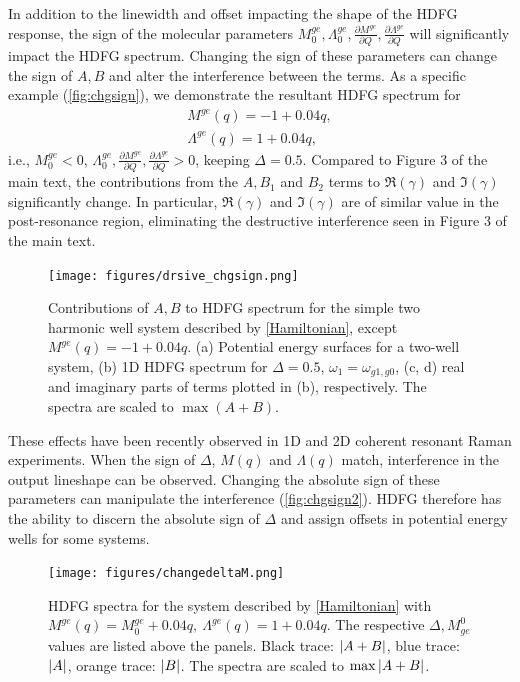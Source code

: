\documentclass[aip, jcp, reprint, onecolumn, nofootinbib]{revtex4-2}
\begin{document}
In addition to the linewidth and offset impacting the shape of the HDFG response, the sign of the molecular parameters $M^{ge}_0, \Lambda^{ge}_0, \frac{\partial M^{ge}}{\partial Q} , \frac{\partial \Lambda^{ge}}{\partial Q}$ will significantly impact the HDFG spectrum.
Changing the sign of these parameters can change the sign of $A, B$ and alter the interference between the terms.  
As a specific example (\autoref{fig:chgsign}), we demonstrate the resultant HDFG spectrum for \begin{eqnarray}
	M^{ge}(q) = -1 + 0.04 q,  \\
	\Lambda^{ge}(q) = 1 + 0.04 q,
\end{eqnarray}
i.e., $M^{ge}_0 < 0$, $\Lambda^{ge}_0, \frac{\partial M^{ge}}{\partial Q} , \frac{\partial \Lambda^{ge}}{\partial Q} > 0$, keeping $\Delta = 0.5$.
Compared to Figure 3 of the main text, the contributions from the $A, B_1$ and $B_2$ terms to $\Re(\gamma)$ and $\Im(\gamma)$ significantly change.
In particular, $\Re(\gamma)$ and $\Im(\gamma)$ are of similar value in the post-resonance region, eliminating the destructive interference seen in Figure 3 of the main text.

\begin{figure}[!htbp]
	\centering
	\texttt{[image: figures/drsive\_chgsign.png]}
	\caption{Contributions of $A, B$ to HDFG spectrum for the simple two harmonic well system described by \autoref{Hamiltonian}, except $M^{ge}(q) = -1 + 0.04 q$.
		(a) Potential energy surfaces for a two-well system, (b) 1D HDFG spectrum for $\Delta = 0.5$, $\omega_1 = \omega_{g1, g0}$, (c, d) real and imaginary parts of terms plotted in (b), respectively.
		The spectra are scaled to $\max{(A+B)}$. 
} 
	\label{fig:chgsign}
\end{figure}

These effects have been recently observed in 1D and 2D coherent resonant Raman experiments.\cite{Fumero2020, Batignani2022}
When the sign of $\Delta$, $M(q)$ and $\Lambda(q)$ match, interference in the output lineshape can be observed.
Changing the absolute sign of these parameters can manipulate the interference (\autoref{fig:chgsign2}).
HDFG therefore has the ability to discern the absolute sign of $\Delta$ and assign offsets in potential energy wells for some systems.

\begin{figure}[!htbp]
	\centering
	\texttt{[image: figures/changedeltaM.png]}
	\caption{HDFG spectra for the system described by \autoref{Hamiltonian} with $M^{ge}(q) = M^{ge}_0 + 0.04 q,\ \Lambda^{ge}(q) = 1 + 0.04 q$. 
	The respective $\Delta, M^{0}_{ge}$ values are listed above the panels.
	Black trace: $\abs{A+B}$, blue trace: $\abs{A}$, orange trace: $\abs{B}$.
	The spectra are scaled to $\max{\abs{A+B}}$. 
	} 
	\label{fig:chgsign2}
\end{figure}
\newpage
\end{document}
